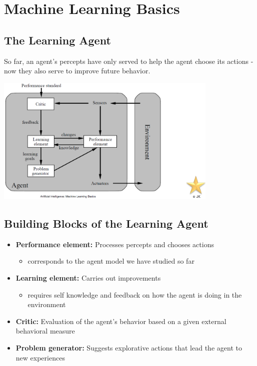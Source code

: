 \documentclass[conference, a4paper]{styles/acmsiggraph}
\begin{document}
    
    
    
    
    

\section{Machine Learning Basics}
    
    \subsection{The Learning Agent}
        So far, an agent's percepts have only served to help the agent choose its actions -now they also serve to improve future behavior.\newline
        
        \includegraphics[width=0.8\textwidth]{imgs/TheLearningAgent.png}\newline
        
    \subsection{Building Blocks of the Learning Agent}
        \begin{itemize}
            \item \textbf{Performance element:} Processes percepts and chooses actions
            \begin{itemize}
                \item corresponds to the agent model we have studied so far
            \end{itemize}
            \item \textbf{Learning element:} Carries out improvements
            \begin{itemize}
                \item requires self knowledge and feedback on how the agent is doing in the environment
            \end{itemize}
            \item \textbf{Critic:} Evaluation of the agent's behavior based on a given external behavioral measure
            \item \textbf{Problem generator:} Suggests explorative actions that lead the agent to new experiences
        \end{itemize}
    
\end{document}
